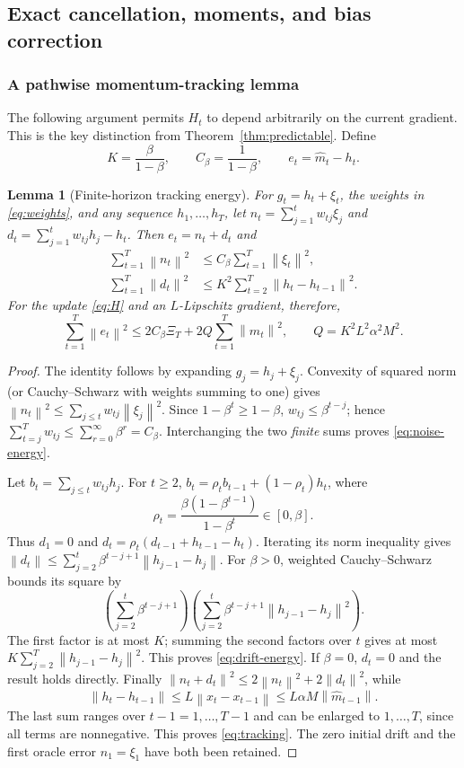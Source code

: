 \documentclass[11pt,a4paper]{article}
\newtheorem{lemma}[theorem]{Lemma}
\theoremstyle{definition}
\theoremstyle{remark}
\newcommand{\norm}[1]{\left\lVert#1\right\rVert}
\begin{document}
\subsection{Exact cancellation, moments, and bias correction}
\subsubsection{A pathwise momentum-tracking lemma}
The following argument permits $H_t$ to depend arbitrarily on the current
gradient. This is the key distinction from Theorem~\ref{thm:predictable}.
Define
\[
 K=\frac\beta{1-\beta},\qquad C_\beta=\frac1{1-\beta},\qquad
 e_t=\widehat m_t-h_t.
\]

\begin{lemma}[Finite-horizon tracking energy]\label{lem:tracking}
For $g_t=h_t+\xi_t$, the weights in \eqref{eq:weights}, and any sequence
$h_1,\ldots,h_T$, let
$n_t=\sum_{j=1}^t w_{tj}\xi_j$ and
$d_t=\sum_{j=1}^t w_{tj}h_j-h_t$. Then $e_t=n_t+d_t$ and
\begin{align}
 \sum_{t=1}^T\norm{n_t}^2&\le C_\beta\sum_{t=1}^T\norm{\xi_t}^2,
 \label{eq:noise-energy}\\
 \sum_{t=1}^T\norm{d_t}^2&\le K^2\sum_{t=2}^T\norm{h_t-h_{t-1}}^2.
 \label{eq:drift-energy}
\end{align}
For the update \eqref{eq:H} and an $L$-Lipschitz gradient, therefore,
\begin{equation}\label{eq:tracking}
 \sum_{t=1}^T\norm{e_t}^2
 \le2C_\beta\Xi_T+2Q\sum_{t=1}^T\norm{\widehat m_t}^2,
 \qquad Q=K^2L^2\alpha^2M^2.
\end{equation}
\end{lemma}
\begin{proof}
The identity follows by expanding $g_j=h_j+\xi_j$. Convexity of squared norm
(or Cauchy--Schwarz with weights summing to one) gives
$\norm{n_t}^2\le\sum_{j\le t}w_{tj}\norm{\xi_j}^2$.
Since $1-\beta^t\ge1-\beta$, $w_{tj}\le\beta^{t-j}$; hence
$\sum_{t=j}^T w_{tj}\le\sum_{r=0}^\infty\beta^r=C_\beta$.
Interchanging the two \emph{finite} sums proves \eqref{eq:noise-energy}.

Let $b_t=\sum_{j\le t}w_{tj}h_j$. For $t\ge2$,
$b_t=\rho_t b_{t-1}+(1-\rho_t)h_t$, where
\[
 \rho_t=\frac{\beta(1-\beta^{t-1})}{1-\beta^t}\in[0,\beta].
\]
Thus $d_1=0$ and $d_t=\rho_t(d_{t-1}+h_{t-1}-h_t)$.
Iterating its norm inequality gives
$\norm{d_t}\le\sum_{j=2}^t\beta^{t-j+1}\norm{h_{j-1}-h_j}$.
For $\beta>0$, weighted Cauchy--Schwarz bounds its square by
\[
 \left(\sum_{j=2}^t\beta^{t-j+1}\right)
 \left(\sum_{j=2}^t\beta^{t-j+1}\norm{h_{j-1}-h_j}^2\right).
\]
The first factor is at most $K$; summing the second factors over $t$ gives
at most $K\sum_{j=2}^T\norm{h_{j-1}-h_j}^2$. This proves
\eqref{eq:drift-energy}. If $\beta=0$, $d_t=0$ and the result holds directly.
Finally $\norm{n_t+d_t}^2\le2\norm{n_t}^2+2\norm{d_t}^2$, while
\[
 \norm{h_t-h_{t-1}}\le L\norm{x_t-x_{t-1}}
 \le L\alpha M\norm{\widehat m_{t-1}}.
\]
The last sum ranges over $t-1=1,\ldots,T-1$ and can be enlarged to
$1,\ldots,T$, since all terms are nonnegative. This proves \eqref{eq:tracking}.
The zero initial drift and the first oracle error $n_1=\xi_1$ have both
been retained.
\end{proof}
\end{document}
